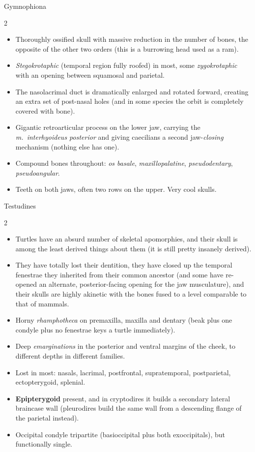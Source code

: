 \documentclass[11pt]{article}
\newcommand{\bone}[1]{\textbf{#1}}
\newcommand{\term}[1]{\textsl{#1}}
\begin{document}
\begin{cladebox}{Gymnophiona}
\begin{multicols}{2}
\begin{itemize}
\item Thoroughly ossified skull with massive reduction in the number of bones, the
  opposite of the other two orders (this is a burrowing head used as a ram).
\item \term{Stegokrotaphic} (temporal region fully roofed) in most, some
  \term{zygokrotaphic} with an opening between squamosal and parietal.
\item The nasolacrimal duct is dramatically enlarged and rotated forward, creating
  an extra set of post-nasal holes (and in some species the orbit is
  completely covered with bone).
\item Gigantic retroarticular process on the lower jaw, carrying the \emph{m.\
  interhyoideus posterior} and giving caecilians a second jaw-\emph{closing}
  mechanism (nothing else has one).
\item Compound bones throughout: \term{os basale}, \term{maxillopalatine},
  \term{pseudodentary}, \term{pseudoangular}.
\item Teeth on both jaws, often two rows on the upper. Very cool skulls.
\end{itemize}
\end{multicols}
\end{cladebox}

\begin{cladebox}{Testudines}
\begin{multicols}{2}
\begin{itemize}
\item Turtles have an absurd number of skeletal apomorphies, and their skull is
  among the least derived things about them (it is still pretty insanely
  derived).
\item They have totally lost their dentition, they have closed up the temporal
  fenestrae they inherited from their common ancestor (and some have re-opened an
  alternate, posterior-facing opening for the jaw musculature), and their skulls
  are highly akinetic with the bones fused to a level comparable to that of
  mammals.
\item Horny \term{rhamphotheca} on premaxilla, maxilla and dentary (beak plus one
  condyle plus no fenestrae keys a turtle immediately).
\item Deep \term{emarginations} in the posterior and ventral margins of the
  cheek, to different depths in different families.
\item Lost in most: nasals, lacrimal, postfrontal,
  supratemporal, postparietal, ectopterygoid, splenial.
\item \bone{Epipterygoid} present, and in cryptodires it builds a secondary lateral
  braincase wall (pleurodires build the same wall from a descending flange of
  the parietal instead).
\item Occipital condyle tripartite (basioccipital plus both exoccipitals), but
  functionally single.
\end{itemize}
\end{multicols}
\end{cladebox}
\end{document}
